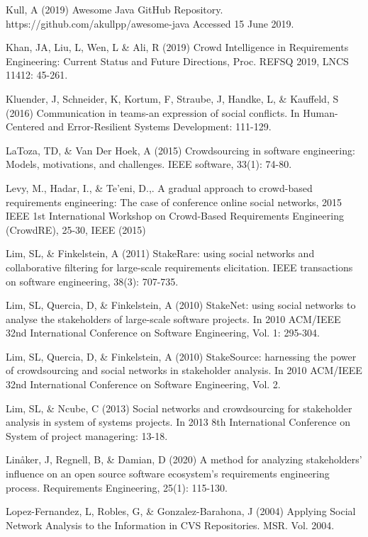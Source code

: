 \begin{thebibliography}{}
Kull, A (2019) Awesome Java GitHub Repository. https://github.com/akullpp/awesome-java Accessed 15 June 2019.

Khan, JA, Liu, L, Wen, L \& Ali, R (2019) Crowd Intelligence in Requirements Engineering: Current Status and Future Directions, Proc. REFSQ 2019, LNCS 11412: 45-261.

Kluender, J, Schneider, K, Kortum, F, Straube, J, Handke, L, \& Kauffeld, S (2016) Communication in teams-an expression of social conflicts. In Human-Centered and Error-Resilient Systems Development: 111-129.

LaToza, TD, \& Van Der Hoek, A (2015) Crowdsourcing in software engineering: Models, motivations, and challenges. IEEE software, 33(1): 74-80.

Levy, M., Hadar, I., \& Te'eni, D.,. A gradual approach to crowd-based requirements engineering: The case of conference online social networks, 2015 IEEE 1st International Workshop on Crowd-Based Requirements Engineering (CrowdRE), 25-30, IEEE (2015)

Lim, SL, \& Finkelstein, A (2011) StakeRare: using social networks and collaborative filtering for large-scale requirements elicitation. IEEE transactions on software engineering, 38(3): 707-735.

Lim, SL, Quercia, D, \& Finkelstein, A (2010) StakeNet: using social networks to analyse the stakeholders of large-scale software projects. In 2010 ACM/IEEE 32nd International Conference on Software Engineering, Vol. 1: 295-304.

Lim, SL, Quercia, D, \& Finkelstein, A (2010) StakeSource: harnessing the power of crowdsourcing and social networks in stakeholder analysis. In 2010 ACM/IEEE 32nd International Conference on Software Engineering, Vol. 2.

Lim, SL, \& Ncube, C (2013) Social networks and crowdsourcing for stakeholder analysis in system of systems projects. In 2013 8th International Conference on System of project managering: 13-18.

Linåker, J, Regnell, B, \& Damian, D (2020) A method for analyzing stakeholders’ influence on an open source software ecosystem’s requirements engineering process. Requirements Engineering, 25(1): 115-130.

Lopez-Fernandez, L, Robles, G, \& Gonzalez-Barahona, J (2004) Applying Social Network Analysis to the Information in CVS Repositories. MSR. Vol. 2004.


\end{thebibliography}
